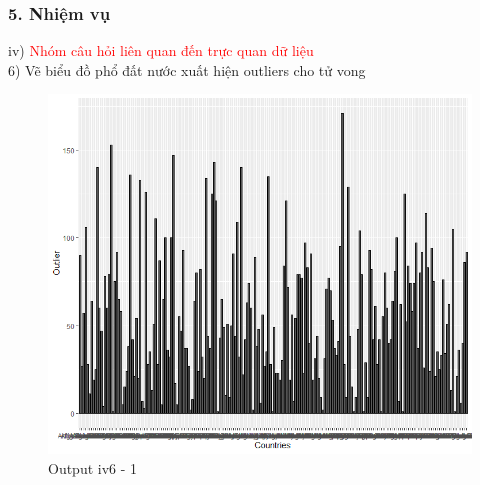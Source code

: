 \documentclass[english,10pt,table]{beamer}
\begin{document}
\begin{frame}[fragile]
\frametitle{5.  Nhiệm vụ}
	iv) \textcolor{red}{Nhóm câu hỏi liên quan đến trực quan dữ liệu}\\%
    6) Vẽ biểu đồ phổ đất nước xuất hiện outliers cho tử vong
	\begin{figure}[h!]
	\begin{center}
		    \includegraphics[scale = 0.4]{Images/IV/iv (6) - 1.png}
		     \caption{Output iv6 - 1}
		\end{center}
		\end{figure}
\end{frame}
\end{document}
